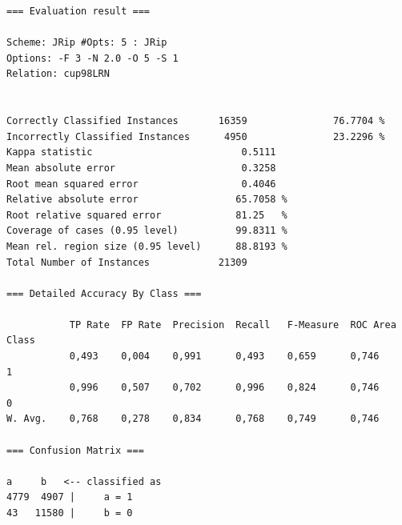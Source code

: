 
\vspace{0.5cm}
\begin{mdframed}[frametitle=JRip con 5 passate successive di ottimizzazione]
\begin{verbatim}
=== Evaluation result ===

Scheme: JRip #Opts: 5 : JRip
Options: -F 3 -N 2.0 -O 5 -S 1
Relation: cup98LRN


Correctly Classified Instances       16359               76.7704 %
Incorrectly Classified Instances      4950               23.2296 %
Kappa statistic                          0.5111
Mean absolute error                      0.3258
Root mean squared error                  0.4046
Relative absolute error                 65.7058 %
Root relative squared error             81.25   %
Coverage of cases (0.95 level)          99.8311 %
Mean rel. region size (0.95 level)      88.8193 %
Total Number of Instances            21309     

=== Detailed Accuracy By Class ===

           TP Rate  FP Rate  Precision  Recall   F-Measure  ROC Area  Class
           0,493    0,004    0,991      0,493    0,659      0,746     1
           0,996    0,507    0,702      0,996    0,824      0,746     0
W. Avg.    0,768    0,278    0,834      0,768    0,749      0,746          

=== Confusion Matrix ===

a     b   <-- classified as
4779  4907 |     a = 1
43   11580 |     b = 0
\end{verbatim}
\end{mdframed}

